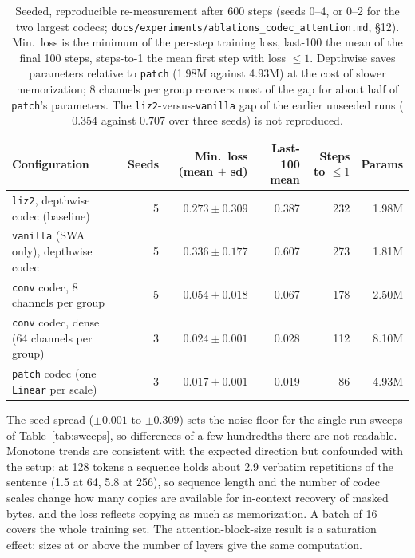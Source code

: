 \documentclass[11pt]{article}
\begin{document}
\begin{table}[t]
\centering
\small
\begin{tabular}{lrrrrr}
\toprule
Configuration & Seeds & Min.\ loss (mean $\pm$ sd) & Last-100 mean & Steps to $\le 1$ & Params \\
\midrule
\texttt{liz2}, depthwise codec (baseline) & 5 & $0.273 \pm 0.309$ & 0.387 & 232 & 1.98M \\
\texttt{vanilla} (SWA only), depthwise codec & 5 & $0.336 \pm 0.177$ & 0.607 & 273 & 1.81M \\
\texttt{conv} codec, 8 channels per group & 5 & $0.054 \pm 0.018$ & 0.067 & 178 & 2.50M \\
\texttt{conv} codec, dense (64 channels per group) & 3 & $0.024 \pm 0.001$ & 0.028 & 112 & 8.10M \\
\texttt{patch} codec (one \texttt{Linear} per scale) & 3 & $0.017 \pm 0.001$ & 0.019 & 86 & 4.93M \\
\bottomrule
\end{tabular}
\caption{Seeded, reproducible re-measurement after 600 steps (seeds 0--4, or 0--2 for the two
largest codecs; \nolinkurl{docs/experiments/ablations_codec_attention.md}, \S12). Min.\ loss is the
minimum of the per-step training loss, last-100 the mean of the final 100 steps, steps-to-1 the mean first step
with loss $\le 1$. Depthwise saves parameters relative to \texttt{patch} (1.98M against 4.93M) at the cost
of slower memorization; 8 channels per group recovers most of the gap for about half of
\texttt{patch}'s parameters. The \texttt{liz2}-versus-\texttt{vanilla} gap of the earlier unseeded runs
($0.354$ against $0.707$ over three seeds) is not reproduced.}
\label{tab:seeds}
\end{table}

The seed spread ($\pm0.001$ to $\pm0.309$) sets the noise floor for the
single-run sweeps of Table~\ref{tab:sweeps}, so differences of a few
hundredths there are not readable. Monotone trends are consistent with the
expected direction but confounded with the setup: at 128 tokens a sequence
holds about 2.9 verbatim repetitions of the sentence (1.5 at 64, 5.8 at 256),
so sequence length and the number of codec scales change how many copies are
available for in-context recovery of masked bytes, and the loss reflects
copying as much as memorization. A batch of 16 covers the whole training set.
The attention-block-size result is a saturation effect: sizes at or above the
number of layers give the same computation.
\end{document}
